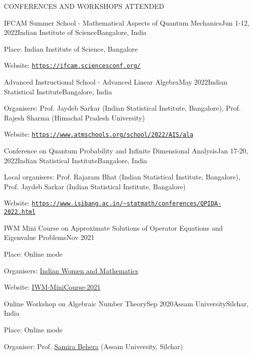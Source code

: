 \documentclass{resume} %
\newcommand{\weblink}[1]{\texttt{\href{#1}{#1}}}
\begin{document}
\begin{rSection}{CONFERENCES AND WORKSHOPS ATTENDED}
	\begin{rSubsection}{IFCAM Summer School - Mathematical Aspects of Quantum Mechanics}{Jun 1-12, 2022}{Indian Institute of Science}{Bangalore, India}
		\item Place: Indian Institute of Science, Bangalore
		\item Website: \weblink{https://ifcam.sciencesconf.org/}
	\end{rSubsection}
	
	\begin{rSubsection}{Advanced Instructional School - Advanced Linear Algebra}{May 2022}{Indian Statistical Institute}{Bangalore, India}
		\item Organisers: Prof. Jaydeb Sarkar (Indian Statistical Institute, Bangalore), Prof. Rajesh Sharma (Himachal Pradesh University)
		
		\item Website: \weblink{https://www.atmschools.org/school/2022/AIS/ala}
	\end{rSubsection}

	\begin{rSubsection}{Conference on Quantum Probability and Infinite Dimensional Analysis}{Jan 17-20, 2022}{Indian Statistical Institute}{Bangalore, India}
		\item Local organisers: Prof. Rajaram Bhat (Indian Statistical Institute, Bangalore), Prof. Jaydeb Sarkar (Indian Statistical Institute, Bangalore)
		
		\item Website: \weblink{https://www.isibang.ac.in/\textasciitilde statmath/conferences/QPIDA-2022.html}
	\end{rSubsection}

	\begin{rSubsection}{IWM Mini Course on Approximate Solutions of Operator Equations and Eigenvalue Problems}{Nov 2021}{}{}
		\item Place: Online mode
		\item Organisers: \href{https://sites.google.com/site/iwmmath/}{Indian Women and Mathematics}
		
		\item Website: \href{https://drive.google.com/file/d/1FYd-6j_hwOMfc2Z9NIQiv2ZqSnF859J4/view}{IWM-MiniCourse-2021}
	\end{rSubsection}

	\begin{rSubsection}{Online Workshop on Algebraic Number Theory}{Sep 2020}{Assam University}{Silchar, India}
		\item Place: Online mode
		\item Organiser: Prof. \href{sbsap.aus@gmail.com}{Samira Behera} (Assam University, Silchar)
	\end{rSubsection}

	
\end{rSection}
\end{document}
